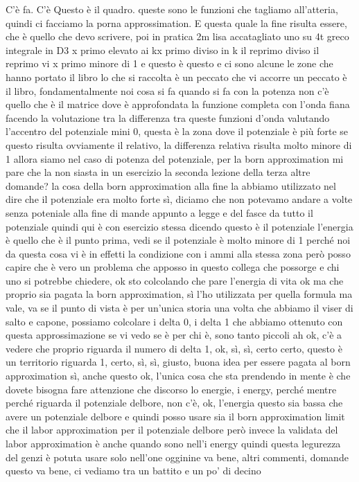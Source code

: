 \begin{soluzione}
{   C'è fa. C'è Questo è il quadro. queste sono le funzioni che tagliamo all'atteria, quindi ci facciamo la porna approssimation. E questa quale la fine risulta essere, che è quello che devo scrivere, poi in pratica 2m lisa accatagliato uno su 4t greco integrale in D3 x primo elevato ai kx primo diviso in k il reprimo diviso il reprimo vi x primo minore di 1 e questo è questo e ci sono alcune le zone che hanno portato il libro lo che si raccolta è un peccato che vi accorre un peccato è il libro, fondamentalmente noi cosa si fa quando si fa con la potenza non c'è quello che è il matrice dove è approfondata la funzione completa con l'onda fiana facendo la volutazione tra la differenza tra queste funzioni d'onda valutando l'accentro del potenziale mini 0, questa è la zona dove il potenziale è più forte se questo risulta ovviamente il relativo, la differenza relativa risulta molto minore di 1 allora siamo nel caso di potenza del potenziale, per la born approximation mi pare che la non siasta in un esercizio la seconda lezione della terza altre domande? la cosa della born approximation alla fine la abbiamo utilizzato nel dire che il potenziale era molto forte sì, diciamo che non potevamo andare a volte senza poteniale alla fine di mande appunto a legge e del fasce da tutto il potenziale quindi qui è con esercizio stessa dicendo questo è il potenziale l'energia è quello che è il punto prima, vedi se il potenziale è molto minore di 1 perché noi da questa cosa vi è in effetti la condizione con i ammi alla stessa zona però posso capire che è vero un problema che apposso in questo collega che possorge e chi uno si potrebbe chiedere, ok sto colcolando che pare l'energia di vita ok ma che proprio sia pagata la born approximation, sì l'ho utilizzata per quella formula ma vale, va se il punto di vista è per un'unica storia una volta che abbiamo il viser di salto e capone, possiamo colcolare i delta 0, i delta 1 che abbiamo ottenuto con questa approssimazione se vi vedo se è per chi è, sono tanto piccoli ah ok, c'è a vedere che proprio riguarda il numero di delta 1, ok, sì, sì, certo certo, questo è un territorio riguarda 1, certo, sì, sì, giusto, buona idea per essere pagata al born approximation sì, anche questo ok, l'unica cosa che sta prendendo in mente è che dovete bisogna fare attenzione che discorso lo energie, i energy, perché mentre perché riguarda il potenziale delbore, non c'è, ok, l'energia questo sia bassa che avere un potenziale delbore e quindi posso usare sia il born approximation limit che il labor approximation per il potenziale delbore però invece la validata del labor approximation è anche quando sono nell'i energy quindi questa legurezza del genzi è potuta usare solo nell'one ogginine va bene, altri commenti, domande questo va bene, ci vediamo tra un battito e un po' di decino
}
\end{soluzione}
